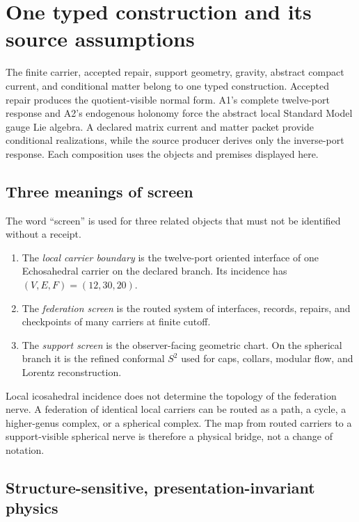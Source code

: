 \section*{One typed construction and its source assumptions}

The finite carrier, accepted repair, support geometry, gravity, abstract
compact current, and conditional matter belong to one typed construction.
Accepted repair produces the quotient-visible normal form. A1's complete
twelve-port response and A2's endogenous holonomy force the abstract local
Standard Model gauge Lie algebra. A declared matrix current and matter packet provide
conditional realizations, while the source producer derives only the
inverse-port response. Each composition uses the objects and premises
displayed here.

\subsection*{Three meanings of screen}

The word ``screen'' is used for three related objects that must not be
identified without a receipt.

\begin{enumerate}[leftmargin=2em]
\item The \emph{local carrier boundary} is the twelve-port oriented interface
of one Echosahedral carrier on the declared branch. Its incidence has
\((V,E,F)=(12,30,20)\).
\item The \emph{federation screen} is the routed system of interfaces,
records, repairs, and checkpoints of many carriers at finite cutoff.
\item The \emph{support screen} is the observer-facing geometric chart. On
the spherical branch it is the refined conformal \(S^2\) used for caps,
collars, modular flow, and Lorentz reconstruction.
\end{enumerate}

Local icosahedral incidence does not determine the topology of the federation
nerve. A federation of identical local carriers can be routed as a path, a
cycle, a higher-genus complex, or a spherical complex. The map from routed
carriers to a support-visible spherical nerve is therefore a physical bridge,
not a change of notation.

\subsection*{Structure-sensitive, presentation-invariant physics}

